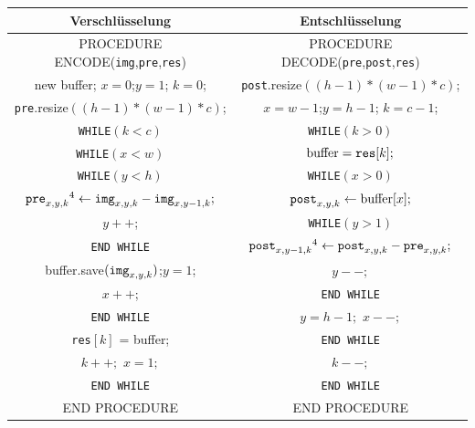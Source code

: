 \documentclass[a4paper,12pt]{article}
\begin{document}
\begin{tabular}{c|c}
Verschlüsselung & Entschlüsselung
\\
\hline
PROCEDURE ENCODE({\tt{img}},{\tt{pre}},{\tt{res}}) & PROCEDURE DECODE({\tt{pre}},{\tt{post}},{\tt{res}})
\\
new buffer; $x=0$;$y=1$; $k=0$; & {\tt{post}}.resize$((h-1)*(w-1)*c)$;
\\
{\tt{pre}}.resize$((h-1)*(w-1)*c)$; & $x=w-1$;$y=h-1$; $k=c-1$;
\\
{\tt{WHILE}}$(k < c)$ &  {\tt{WHILE}}$(k > 0)$
\\
{\tt{WHILE}}$(x < w)$ &  $\text{buffer} = \text{{\tt{res}}}[k];$
\\
{\tt{WHILE}}$(y < h)$ &   {\tt{WHILE}}$(x>0)$
\\
$\text{{\tt{pre}}}_{x,y,k}\footnotemark[4]\leftarrow \text{{\tt{img}}}_{x,y,k} - \text{{\tt{img}}}_{x,y-1,k};$ &  $\text{{\tt{post}}}_{x,y,k}\leftarrow \text{buffer}[x];$
\\
$y++$; & {\tt{WHILE}}$(y>1)$
\\
{\tt{END {\tt{WHILE}}}} &  $\text{{\tt{post}}}_{x,y-1,k}\footnotemark[4]\leftarrow \text{{\tt{post}}}_{x,y,k} - \text{{\tt{pre}}}_{x,y,k};$
\\
buffer.save$(\text{{\tt{img}}}_{x,y,k})$;\;$y=1$; & $y--;$
\\
$x++$; & {\tt{END {\tt{WHILE}}}} 
\\
{\tt{END {\tt{WHILE}}}} &  $y=h-1;$ $x--;$
\\
{\tt{res}}$[k]$ = buffer;& {\tt{END {\tt{WHILE}}}} 
\\
 $k++;$ $x=1;$ &  $k--;$ 
\\
{\tt{END {\tt{WHILE}}}}  & {\tt{END {\tt{WHILE}}}}
\\ 
END PROCEDURE & END PROCEDURE
\end{tabular}
\end{document}
